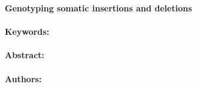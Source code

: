 \noindent
\large {\bf Genotyping somatic insertions and deletions} 


\normalsize 


\noindent \paragraph{Keywords:} 

\noindent \paragraph{Abstract:} 



\noindent \paragraph{Authors:} 

